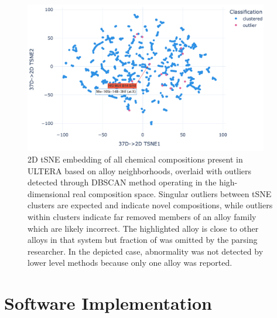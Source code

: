 \begin{figure}[H]
    \centering
    \includegraphics[width=0.95\textwidth]{pyqalloy/PyQAlloy_tSNE+DBSCAN.png}
    \caption{2D tSNE embedding of all chemical compositions present in ULTERA based on alloy neighborhoods, overlaid with outliers detected through DBSCAN method operating in the high-dimensional real composition space. Singular outliers between tSNE clusters are expected and indicate novel compositions, while outliers within clusters indicate far removed members of an alloy family which are likely incorrect. The highlighted  alloy is close to other alloys in that system but fraction of  was omitted by the parsing researcher. In the depicted case, abnormality was not detected by lower level methods because only one alloy was reported.}
    \label{pyqalloy:fig:patternglobal}
\end{figure}





\section{Software Implementation} \label{pyqalloy:sec:software}

\todo









\printbibliography[heading=subbibintoc]